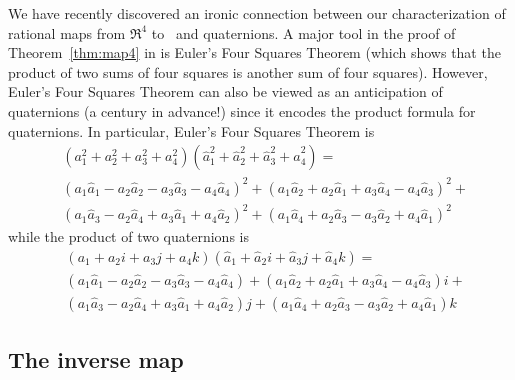 \begin{rmk}
We have recently discovered an ironic connection 
between our characterization
of rational maps from $\Re^4$ to \ and quaternions.
A major tool in the proof of Theorem~\ref{thm:map4} in \cite{jj98a}
is Euler's Four Squares Theorem (which shows that the product
of two sums of four squares is another sum of four squares).
However, Euler's Four Squares Theorem can also be viewed as an anticipation
of quaternions (a century in advance!)
since it encodes the product formula for quaternions.
In particular, Euler's Four Squares Theorem is 
\[
\begin{array}{ll}
& (a_1^2 + a_2^2 + a_3^2 + a_4^2) 
(\hat{a}^2_1 + \hat{a}^2_2 + \hat{a}^2_3 + \hat{a}^2_4) = \\
& (a_1 \hat{a}_1 - a_2\hat{a}_2 - a_3\hat{a}_3 - a_4\hat{a}_4)^2 +
   (a_1\hat{a}_2 + a_2\hat{a}_1 + a_3\hat{a}_4 - a_4\hat{a}_3)^2 + \\
& (a_1\hat{a}_3 - a_2\hat{a}_4 + a_3\hat{a}_1 + a_4\hat{a}_2)^2 +
   (a_1\hat{a}_4 + a_2\hat{a}_3 - a_3\hat{a}_2 + a_4\hat{a}_1)^2
\end{array}
\]
while the product of two quaternions is
\[
\begin{array}{ll}
& (a_1 + a_2 i + a_3 j + a_4 k) 
(\hat{a}_1 + \hat{a}_2 i + \hat{a}_3 j + \hat{a}_4 k) = \\
& (a_1 \hat{a}_1 - a_2\hat{a}_2 - a_3\hat{a}_3 - a_4\hat{a}_4) +
   (a_1\hat{a}_2 + a_2\hat{a}_1 + a_3\hat{a}_4 - a_4\hat{a}_3) i + \\
&  (a_1\hat{a}_3 - a_2\hat{a}_4 + a_3\hat{a}_1 + a_4\hat{a}_2) j +
   (a_1\hat{a}_4 + a_2\hat{a}_3 - a_3\hat{a}_2 + a_4\hat{a}_1) k
\end{array}
\]
\end{rmk}

\subsection{The inverse map}


